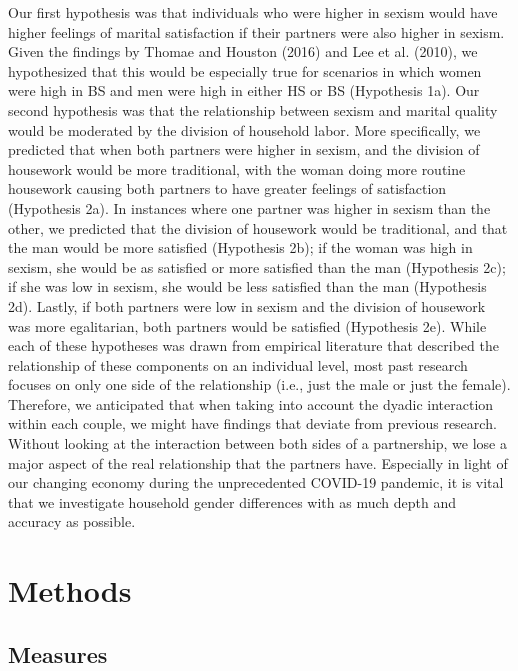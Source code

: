 \documentclass[
  man]{apa6}
\begin{document}
Our first hypothesis was that individuals who were higher in sexism would have higher feelings of marital satisfaction if their partners were also higher in sexism. Given the findings by Thomae and Houston (2016) and Lee et al. (2010), we hypothesized that this would be especially true for scenarios in which women were high in BS and men were high in either HS or BS (Hypothesis 1a). Our second hypothesis was that the relationship between sexism and marital quality would be moderated by the division of household labor. More specifically, we predicted that when both partners were higher in sexism, and the division of housework would be more traditional, with the woman doing more routine housework causing both partners to have greater feelings of satisfaction (Hypothesis 2a). In instances where one partner was higher in sexism than the other, we predicted that the division of housework would be traditional, and that the man would be more satisfied (Hypothesis 2b); if the woman was high in sexism, she would be as satisfied or more satisfied than the man (Hypothesis 2c); if she was low in sexism, she would be less satisfied than the man (Hypothesis 2d). Lastly, if both partners were low in sexism and the division of housework was more egalitarian, both partners would be satisfied (Hypothesis 2e). While each of these hypotheses was drawn from empirical literature that described the relationship of these components on an individual level, most past research focuses on only one side of the relationship (i.e., just the male or just the female). Therefore, we anticipated that when taking into account the dyadic interaction within each couple, we might have findings that deviate from previous research. Without looking at the interaction between both sides of a partnership, we lose a major aspect of the real relationship that the partners have. Especially in light of our changing economy during the unprecedented COVID-19 pandemic, it is vital that we investigate household gender differences with as much depth and accuracy as possible.

\hypertarget{methods}{%
\section{Methods}\label{methods}}

\hypertarget{measures}{%
\subsection{Measures}\label{measures}}
\end{document}
